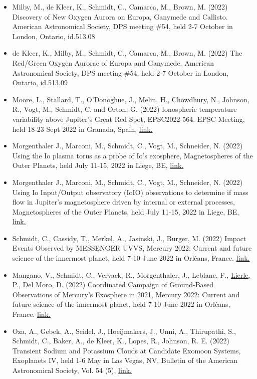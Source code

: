 \documentclass[12pt]{report}
\begin{document}
\begin{itemize}
   \item Milby, M., de Kleer, K., Schmidt, C., Camarca, M., Brown, M. (2022) Discovery of New Oxygen Aurora on Europa, Ganymede and Callisto. American Astronomical Society, DPS meeting \#54, held 2-7 October in London, Ontario, id.513.08
   \item de Kleer, K., Milby, M., Schmidt, C., Camarca, M., Brown, M. (2022) The Red/Green Oxygen Aurorae of Europa and Ganymede. American Astronomical Society, DPS meeting \#54, held 2-7 October in London, Ontario, id.513.09
   \item Moore, L., Stallard, T., O'Donoghue, J., Melin, H., Chowdhury, N., Johnson, R., Vogt, M.,  Schmidt, C. and Orton, G. (2022) Ionospheric temperature variability above Jupiter's Great Red Spot, EPSC2022-564. EPSC Meeting, held 18-23 Sept 2022 in Granada, Spain, \href{https://meetingorganizer.copernicus.org/epsc2022/sessionprogramme}{link.}
   \item Morgenthaler J., Marconi, M., Schmidt, C., Vogt, M., Schneider, N. (2022) Using the Io plasma torus as a probe of Io's exosphere,  Magnetospheres of the Outer Planets, held July 11-15, 2022 in Liege, BE, \href{ https://www.mop.uliege.be/}{link.}
   \item Morgenthaler J., Marconi, M., Schmidt, C., Vogt, M., Schneider, N. (2022)  Using Io Input/Output observatory (IoIO) observations to determine if mass flow in Jupiter's magnetosphere driven by internal or external processes,  Magnetospheres of the Outer Planets, held July 11-15, 2022 in Liege, BE, \href{ https://www.mop.uliege.be/}{link.}
   \item Schmidt, C., Cassidy, T., Merkel, A., Jasinski, J., Burger, M. (2022) Impact Events Observed by MESSENGER UVVS, Mercury 2022: Current and future science of the innermost planet, held 7-10 June 2022 in Orl\'eans, France. \href{https://mercury2020.ias.u-psud.fr/main_1st.php}{link.} 
   \item Mangano, V., Schmidt, C., Vervack, R., Morgenthaler, J., Leblanc, F., \underline{Lierle, P.}, Del Moro, D. (2022) Coordinated Campaign of Ground-Based Observations of Mercury’s Exosphere in 2021, Mercury 2022: Current and future science of the innermost planet, held 7-10 June 2022 in Orl\'eans, France. \href{https://mercury2020.ias.u-psud.fr/main_1st.php}{link.} 
   \item Oza, A., Gebek, A., Seidel, J., Hoeijmakers, J., Unni, A., Thirupathi, S., Schmidt, C., Baker, A., de Kleer, K., Lopes, R., Johnson, R.  E. (2022) Transient Sodium and Potassium Clouds at Candidate Exomoon Systems, Exoplanets IV, held 1-6 May in Las Vegas, NV, Bulletin of the American Astronomical Society, Vol. 54 (5), \href{https://baas.aas.org/pub/2022n5i208p02}{link.} 

\end{itemize}
\end{document}
